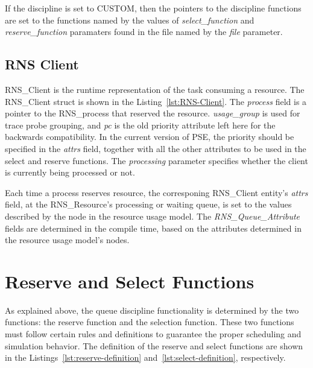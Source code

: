 If the discipline is set to CUSTOM, then the pointers to the discipline functions are set to the functions named by the values of \emph{select\_function} and \emph{reserve\_function} paramaters found in the file named by the \emph{file} parameter.

\subsection{RNS Client}
RNS\_Client is the runtime representation of the task consuming a resource. The RNS\_Client struct is shown in the Listing~\ref{lst:RNS-Client}. The \emph{process} field is a pointer to the RNS\_process that reserved the resource. \emph{usage\_group} is used for trace probe grouping, and \emph{pc} is the old priority attribute left here for the backwards compatibility. In the current version of PSE, the priority should be specified in the \emph{attrs} field, together with all the other attributes to be used in the select and reserve functions. The \emph{processing} parameter specifies whether the client is currently being processed or not.



Each time a process reserves resource, the corresponing RNS\_Client entity's \emph{attrs} field, at the RNS\_Resource's processing or waiting queue, is set to the values described by the node in the resource usage model. The \emph{RNS\_Queue\_Attribute} fields are determined in the compile time, based on the attributes determined in the resource usage model's nodes.

\section{Reserve and Select Functions}

As explained above, the queue discipline functionality is determined by the two functions: the reserve function and the selection function. These two functions must follow certain rules and definitions to guarantee the proper scheduling and simulation behavior. The definition of the reserve and select functions are shown in the Listings~\ref{lst:reserve-definition} and~\ref{lst:select-definition}, respectively.



